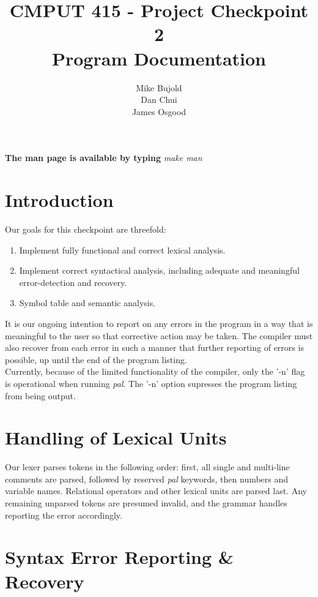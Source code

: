 \documentclass{report}
\title{CMPUT 415 - Project Checkpoint 2\\Program Documentation}
\author{Mike Bujold \\
Dan Chui \\ 
James Osgood }
\begin{document}
\maketitle
\textbf{The man page is available by typing} \emph{make man}

\section*{Introduction}
Our goals for this checkpoint are threefold:
\begin{enumerate}
\item Implement fully functional and correct lexical analysis.
\item Implement correct syntactical analysis, including adequate and meaningful error-detection and recovery.
\item Symbol table and semantic analysis.
\end{enumerate}

It is our ongoing intention to report on any errors in the program in a way that is meaningful to the user so that corrective action may be taken. The compiler must also recover from each error in such a manner that further reporting of errors is possible, up until the end of the program listing.\\
Currently, because of the limited functionality of the compiler, only the '-n' flag is operational when running \emph{pal}. The '-n' option supresses the program listing from being output.


\section*{Handling of Lexical Units}
Our lexer parses tokens in the following order: first, all single and multi-line comments are parsed, followed by reserved \emph{pal} keywords, then numbers and variable names. Relational operators and other lexical units are parsed last. Any remaining unparsed tokens are presumed invalid, and the grammar handles reporting the error accordingly.


\section*{Syntax Error Reporting \& Recovery}
\end{document}
